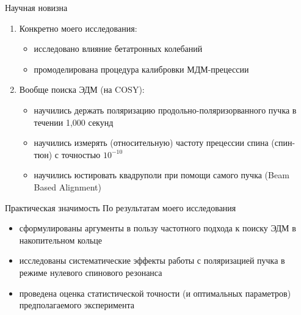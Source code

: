 \documentclass[14pt]{beamer}
\begin{document}
\begin{frame}{Научная новизна}
	\begin{enumerate}
		\item Конкретно моего исследования: 
			\begin{itemize}
				\item исследовано влияние бетатронных колебаний
				\item промоделирована процедура калибровки МДМ-прецессии
			\end{itemize}
		\item Вообще поиска ЭДМ (на COSY): 
		\begin{itemize}
			\item научились держать поляризацию продольно-поляризорванного пучка в течении 1,000 секунд
			\item научились измерять (относительную) частоту прецессии спина (спин-тюн) с точностью $10^{-10}$
			\item научились юстировать квадруполи при помощи самого пучка (Beam Based Alignment)
		\end{itemize}
	\end{enumerate}
\end{frame}

\begin{frame}{Практическая значимость}
	По результатам моего исследования 
	\begin{itemize}
		\item сформулированы аргументы в пользу частотного подхода к поиску ЭДМ в накопительном кольце
		\item исследованы систематические эффекты работы с поляризацией пучка в режиме нулевого спинового резонанса
		\item проведена оценка статистической точности (и оптимальных параметров) предполагаемого эксперимента
	\end{itemize}
\end{frame}
\end{document}
